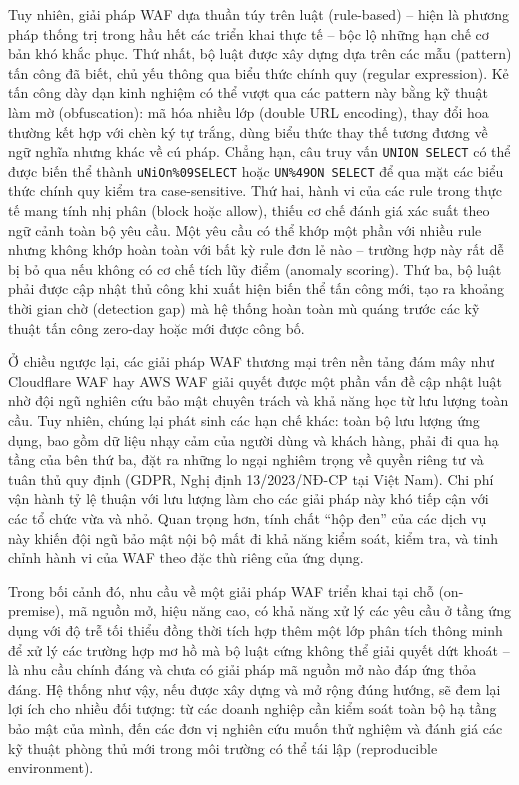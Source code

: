 \documentclass[../DoAn.tex]{subfiles}
\begin{document}
Tuy nhiên, giải pháp WAF dựa thuần túy trên luật (rule-based) -- hiện là phương
pháp thống trị trong hầu hết các triển khai thực tế -- bộc lộ những hạn chế cơ bản
khó khắc phục. Thứ nhất, bộ luật được xây dựng dựa trên các mẫu (pattern) tấn
công đã biết, chủ yếu thông qua biểu thức chính quy (regular expression). Kẻ tấn
công dày dạn kinh nghiệm có thể vượt qua các pattern này bằng kỹ thuật làm mờ
(obfuscation): mã hóa nhiều lớp (double URL encoding), thay đổi hoa thường kết
hợp với chèn ký tự trắng, dùng biểu thức thay thế tương đương về ngữ nghĩa nhưng
khác về cú pháp. Chẳng hạn, câu truy vấn \texttt{UNION SELECT} có thể được biến
thể thành \texttt{uNiOn\%09SELECT} hoặc \texttt{UN\%49ON SELECT} để qua mặt
các biểu thức chính quy kiểm tra case-sensitive. Thứ hai, hành vi của các rule
trong thực tế mang tính nhị phân (block hoặc allow), thiếu cơ chế đánh giá xác
suất theo ngữ cảnh toàn bộ yêu cầu. Một yêu cầu có thể khớp một phần với nhiều
rule nhưng không khớp hoàn toàn với bất kỳ rule đơn lẻ nào -- trường hợp này
rất dễ bị bỏ qua nếu không có cơ chế tích lũy điểm (anomaly scoring). Thứ ba,
bộ luật phải được cập nhật thủ công khi xuất hiện biến thể tấn công mới, tạo ra
khoảng thời gian chờ (detection gap) mà hệ thống hoàn toàn mù quáng trước các
kỹ thuật tấn công zero-day hoặc mới được công bố.

Ở chiều ngược lại, các giải pháp WAF thương mại trên nền tảng đám mây như
Cloudflare WAF hay AWS WAF giải quyết được một phần vấn đề cập nhật luật nhờ
đội ngũ nghiên cứu bảo mật chuyên trách và khả năng học từ lưu lượng toàn cầu.
Tuy nhiên, chúng lại phát sinh các hạn chế khác: toàn bộ lưu lượng ứng dụng,
bao gồm dữ liệu nhạy cảm của người dùng và khách hàng, phải đi qua hạ tầng
của bên thứ ba, đặt ra những lo ngại nghiêm trọng về quyền riêng tư và tuân thủ
quy định (GDPR, Nghị định 13/2023/NĐ-CP tại Việt Nam). Chi phí vận hành tỷ
lệ thuận với lưu lượng làm cho các giải pháp này khó tiếp cận với các tổ chức vừa
và nhỏ. Quan trọng hơn, tính chất ``hộp đen'' của các dịch vụ này khiến đội ngũ
bảo mật nội bộ mất đi khả năng kiểm soát, kiểm tra, và tinh chỉnh hành vi của
WAF theo đặc thù riêng của ứng dụng.

Trong bối cảnh đó, nhu cầu về một giải pháp WAF triển khai tại chỗ (on-premise),
mã nguồn mở, hiệu năng cao, có khả năng xử lý các yêu cầu ở tầng ứng dụng với
độ trễ tối thiểu đồng thời tích hợp thêm một lớp phân tích thông minh để xử lý
các trường hợp mơ hồ mà bộ luật cứng không thể giải quyết dứt khoát -- là nhu
cầu chính đáng và chưa có giải pháp mã nguồn mở nào đáp ứng thỏa đáng. Hệ
thống như vậy, nếu được xây dựng và mở rộng đúng hướng, sẽ đem lại lợi ích
cho nhiều đối tượng: từ các doanh nghiệp cần kiểm soát toàn bộ hạ tầng bảo mật
của mình, đến các đơn vị nghiên cứu muốn thử nghiệm và đánh giá các kỹ thuật
phòng thủ mới trong môi trường có thể tái lập (reproducible environment).
\end{document}
